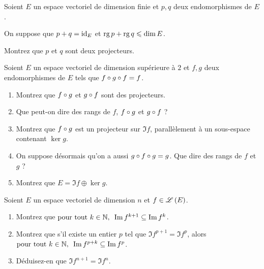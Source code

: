 \begin{corr}
\end{corr}

\begin{exo}
Soient \(E\) un espace vectoriel de dimension finie et \(p,q\) deux endomorphismes de \(E\).

On suppose que \(p+q=\mathrm{id}_{E}\) et \(\operatorname{rg} p+\operatorname{rg} q\leqslant\dim E\).

Montrez que \(p\) et \(q\) sont deux projecteurs.
\end{exo}

\begin{corr}
\end{corr}

\begin{exo}
Soient \(E\) un espace vectoriel de dimension supérieure à \(2\) et \(f,g\) deux endomorphismes de \(E\) tels que \(f\circ g\circ f=f\).

\begin{enumerate}
    \item Montrez que \(f\circ g\) et \(g\circ f\) sont des projecteurs. \\
    \item Que peut-on dire des rangs de \(f\), \(f\circ g\) et \(g\circ f\) ? \\
    \item Montrez que \(f\circ g\) est un projecteur sur \(\Im f\), parallèlement à un sous-espace contenant \(\ker g\). \\
    \item On suppose désormais qu'on a aussi \(g\circ f\circ g=g\). Que dire des rangs de \(f\) et \(g\) ? \\
    \item Montrez que \(E=\Im f\oplus\ker g\).
\end{enumerate}
\end{exo}

\begin{corr}
\end{corr}

\begin{exo}
Soient \(E\) un espace vectoriel de dimension \(n\) et \(f\in\mathscr{L}\left(E\right)\).

\begin{enumerate}
    \item Montrez que \(\quantifs{\tpt k\in\N}\Im f^{k+1}\subset\Im f^k\). \\
    \item Montrez que s'il existe un entier \(p\) tel que \(\Im f^{p+1}=\Im f^p\), alors \(\quantifs{\tpt k\in\N}\Im f^{p+k}\subset\Im f^p\). \\
    \item Déduisez-en que \(\Im f^{n+1}=\Im f^n\).
\end{enumerate}
\end{exo}

